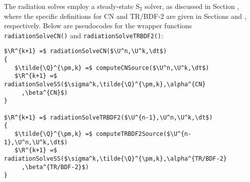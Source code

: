 The radiation solves employ a steady-state S$_2$ solver, as discussed
in Section , where the specific definitions for
CN and TR/BDF-2 are given in Sections  and ,
respectively. Below are pseudocodes for the wrapper functions
\texttt{radiationSolveCN()} and \texttt{radiationSolveTRBDF2()}:

\begin{lstlisting}[mathescape,columns=fullflexible,
   basicstyle=\fontfamily{lmvtt}\selectfont]
$\R^{k+1} =$ radiationSolveCN($\U^n,\U^k,\dt$)
{
   $\tilde{\Q}^{\pm,k} =$ computeCNSource($\U^n,\U^k,\dt$)
   $\R^{k+1} =$ radiationSolveSS($\sigma^k,\tilde{\Q}^{\pm,k},\alpha^{CN}
     ,\beta^{CN}$)
}

$\R^{k+1} =$ radiationSolveTRBDF2($\U^{n-1},\U^n,\U^k,\dt$)
{
   $\tilde{\Q}^{\pm,k} =$ computeTRBDF2Source($\U^{n-1},\U^n,\U^k,\dt$)
   $\R^{k+1} =$ radiationSolveSS($\sigma^k,\tilde{\Q}^{\pm,k},\alpha^{TR/BDF-2}
     ,\beta^{TR/BDF-2}$)
}
\end{lstlisting}


